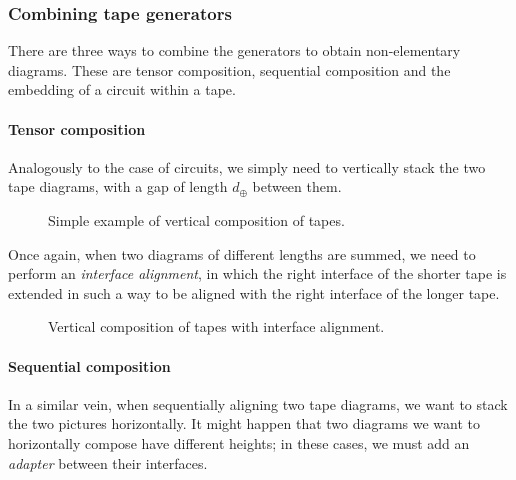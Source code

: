 \documentclass{article}
\begin{document}
\pagebreak

\subsubsection{Combining tape generators}
There are three ways to combine the generators to obtain non-elementary diagrams. These are tensor composition, sequential composition and the embedding of a circuit within a tape.

\paragraph{Tensor composition} Analogously to the case of circuits, we simply need to vertically stack the two tape diagrams, with a gap of length $d_\oplus$ between them.

\begin{figure}[ht]
\caption{Simple example of vertical composition of tapes.}
\end{figure}
Once again, when two diagrams of different lengths are summed, we need to perform an \emph{interface alignment}, in which the right interface of the shorter tape is extended in such a way to be aligned with the right interface of the longer tape.

\begin{figure}[ht]
\caption{Vertical composition of tapes with interface alignment.}
\end{figure}

\paragraph{Sequential composition} In a similar vein, when sequentially aligning two tape diagrams, we want to stack the two pictures horizontally. It might happen that two diagrams we want to horizontally compose have different heights; in these cases, we must add an \emph{adapter} between their interfaces.
\end{document}
